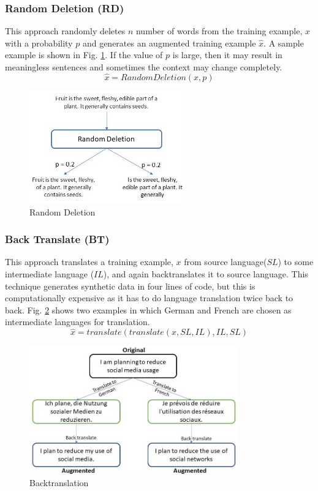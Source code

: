 \documentclass{article}
\begin{document}
\subsubsection{Random Deletion (RD)}
This approach randomly deletes $n$ number of words from the training example, $x$ with a probability $p$ and generates an augmented training example $\hat{x}$. A sample example is shown in Fig. \ref{fig:randomdelete}. If the value of $p$ is large, then it may result in meaningless sentences and sometimes the context may change completely.
\begin{equation}
\hat{x} = RandomDeletion(x, p)
\end{equation}
\begin{figure}[h!]
\centering
  \includegraphics[width=0.6\textwidth]{randomdelete.jpg}
  \caption{Random Deletion}
  \label{fig:randomdelete}
\end{figure}

\subsubsection{Back Translate (BT)}
This approach translates a training example, $x$ from source language($SL$) to some intermediate language ($IL$), and again backtranslates it to source language. This technique generates synthetic data in four lines of code, but this is computationally expensive as it has to do language translation twice back to back. Fig. \ref{fig:backtranslate} shows two examples in which German and French are chosen as intermediate languages for translation.
\begin{equation}
\hat{x} = translate( translate(x, SL, IL), IL, SL)
\end{equation}
\begin{figure}[h!]
\centering
  \includegraphics[width=0.8\textwidth]{backtranslate.jpg}
  \caption{Backtranslation}
  \label{fig:backtranslate}
\end{figure}
\end{document}
